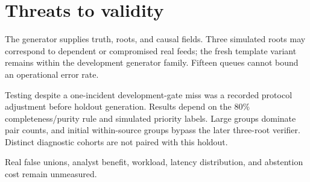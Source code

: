 \section{Threats to validity}
The generator supplies truth, roots, and causal fields. Three simulated roots may correspond to dependent or compromised real feeds; the fresh template variant remains within the development generator family. Fifteen queues cannot bound an operational error rate.

Testing despite a one-incident development-gate miss was a recorded protocol adjustment before holdout generation. Results depend on the 80\% completeness/purity rule and simulated priority labels. Large groups dominate pair counts, and initial within-source groups bypass the later three-root verifier. Distinct diagnostic cohorts are not paired with this holdout.

Real false unions, analyst benefit, workload, latency distribution, and abstention cost remain unmeasured.
